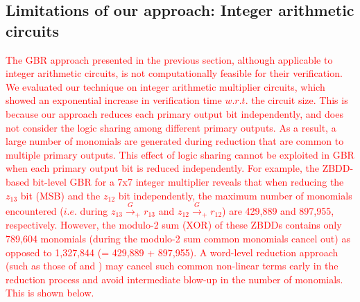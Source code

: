 \subsection{Limitations of our approach: Integer arithmetic circuits}
\textcolor{red}{
The GBR approach presented in the previous section, although
applicable to integer arithmetic circuits, is not computationally
feasible for their verification. 
We evaluated  our technique on integer arithmetic multiplier
circuits, which showed an  exponential increase in verification time
$w.r.t.$ the circuit size. This is because our approach reduces 
each primary output bit independently, and does not consider the logic
sharing among different primary outputs. As a result, a large number
of monomials are generated during reduction that are common to 
multiple primary outputs. This effect of logic sharing cannot be
exploited in GBR when each primary output bit is reduced
independently. 
For example, the ZBDD-based bit-level GBR for a 7x7 integer
multiplier reveals that when reducing the $z_{13}$ bit (MSB) and
the $z_{12}$ bit independently, the maximum number of monomials
encountered ($i.e.$ during $z_{13} \xrightarrow{G}_+ r_{13}$ and
$z_{12} \xrightarrow{G}_+ r_{12}$) are 429,889 and 897,955,
respectively.  However, the modulo-2 sum (XOR) of these ZBDDs contains
only 789,604 monomials  (during the modulo-2 sum common monomials
cancel out) as opposed to 1,327,844 (= 429,889 + 897,955).
A word-level reduction approach (such as those of
\cite{ciesielski:dac2015} and \cite{rolf:date16}) may cancel such
common non-linear terms early in the reduction process and avoid
intermediate blow-up in the number of monomials. This is shown below.
}

